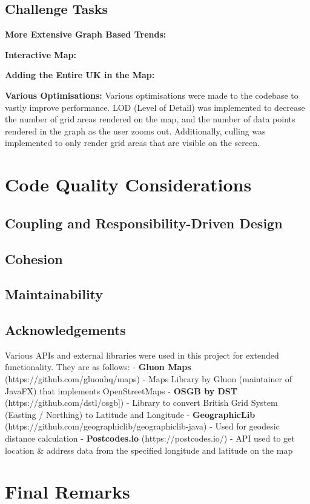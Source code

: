 \documentclass[10pt, a4paper]{scrartcl}
\begin{document}
\begin{multicols}{2}
        \subsection{Challenge Tasks}

        \noindent \textbf{More Extensive Graph Based Trends:}

        \noindent \textbf{Interactive Map:}

        \noindent \textbf{Adding the Entire UK in the Map:}

        \noindent \textbf{Various Optimisations:} Various optimisations were made to the codebase to vastly improve performance.
        LOD (Level of Detail) was implemented to decrease the number of grid areas rendered on the map, and the number of data points
        rendered in the graph as the user zooms out. Additionally, culling was implemented to only render grid areas that are visible
        on the screen.
       
        \section{Code Quality Considerations}

        \subsection{Coupling and Responsibility-Driven Design}
      
        \subsection{Cohesion}
        
        \subsection{Maintainability}

        \subsection{Acknowledgements}
        \noindent Various APIs and external libraries were used in this project for extended functionality. They are as follows:
        - \textbf{Gluon Maps} (https://github.com/gluonhq/maps) - Maps Library by Gluon (maintainer of JavaFX) that implements OpenStreetMaps
        - \textbf{OSGB by DST} (https://github.com/dstl/osgb]) - Library to convert British Grid System (Easting / Northing) to Latitude and Longitude
        - \textbf{GeographicLib} (https://github.com/geographiclib/geographiclib-java) - Used for geodesic distance calculation
        - \textbf{Postcodes.io} (https://postcodes.io/) - API used to get location & address data from the specified longitude and latitude on the map
        
        \section{Final Remarks}
        
    \end{multicols}
\end{document}
